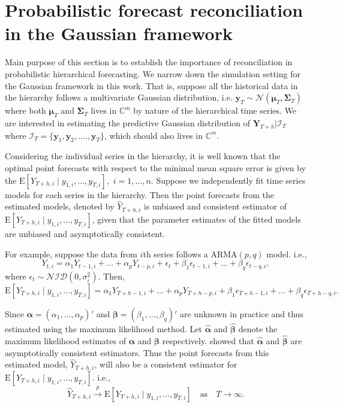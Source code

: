 \documentclass[a4paper, 11pt]{article}
\def\E{\text{E}}
\begin{document}
\section{Probabilistic forecast reconciliation in the Gaussian framework}\label{sec:gaussian}

Main purpose of this section is to establish the importance of reconciliation in probabilistic hierarchical forecasting. We narrow down the simulation setting for the Gaussian framework in this work. That is, suppose all the historical data in the hierarchy follows a multivariate Gaussian distribution, i.e. $\bm{y}_T \sim \mathscr{N}(\bm{\mu}_T, \bm{\Sigma}_T)$ where both $\bm{\mu}_T$ and $\bm{\Sigma}_T$ lives in $\mathbb{C}^m$ by nature of the hierarchical time series. We are interested in estimating the predictive Gaussian distribution of $\bm{Y}_{T+h}| \bm{\mathcal{I}}_T$ where $\bm{\mathcal{I}}_T= \{\bm{y}_1,\bm{y}_2,\dots.,\bm{y}_T\}$, which should also lives in $\mathbb{C}^m$.

Considering the individual series in the hierarchy, it is well known that the optimal point forecasts with respect to the minimal mean square error is given by the $\E[Y_{T+h,i}\mid y_{1,i},\dots,y_{T,i}],$ $i=1,\dots,n$. Suppose we independently fit time series models for each series in the hierarchy. Then the point forecasts from the estimated models, denoted by $\hat{Y}_{T+h,i}$ is unbiased and consistent estimator of $\E[Y_{T+h,i}\mid y_{1,i},\dots,y_{T,i}]$, given that the parameter estimates of the fitted models are unbiased and asymptotically consistent.

For example, suppose the data from $i$th series follows a ARMA$(p,q)$ model. i.e.,
$$
Y_{t,i}=\alpha_1Y_{t-1,i}+\dots+\alpha_pY_{t-p,i}+\epsilon_t + \beta_1\epsilon_{t-1,i}+\dots+\beta_q\epsilon_{t-q,i},
$$
where $\epsilon_t \sim \mathcal{NID}(0, \sigma_i^2)$. Then,
$$
\E[Y_{T+h,i}\mid y_{1,i},\dots,y_{T,i}] = \alpha_1Y_{T+h-1,i}+\dots+\alpha_pY_{T+h-p,i}+ \beta_1\epsilon_{T+h-1,i}+\dots+\beta_q\epsilon_{T+h-q,i}.
$$

Since $\bm{\alpha} = (\alpha_1,\dots,\alpha_p)'$ and $\bm{\beta} = (\beta_1,\dots,\beta_q)'$ are unknown in practice and thus estimated using the maximum likelihood method. Let $\bm{\hat{\alpha}}$ and $\bm{\hat{\beta}}$ denote the maximum likelihood estimates of $\bm{\alpha}$ and $\bm{\beta}$ respectively. \citet{Yao2006} showed that $\bm{\hat{\alpha}}$ and $\bm{\hat{\beta}}$ are asymptotically consistent estimators. Thus the point forecasts from this estimated model, $\hat{Y}_{T+h,i}$, will also be a consistent estimator for $\E[Y_{T+h,i}\mid y_{1,i},\dots,y_{T,i}]$. i.e.,
\begin{equation} \label{eq:(6.01)}
\hat{Y}_{T+h,i} \overset{p}{\to} \E[Y_{T+h,i}\mid y_{1,i},\dots,y_{T,i}] \quad \text{as} \quad T \to \infty.
\end{equation}
\end{document}
